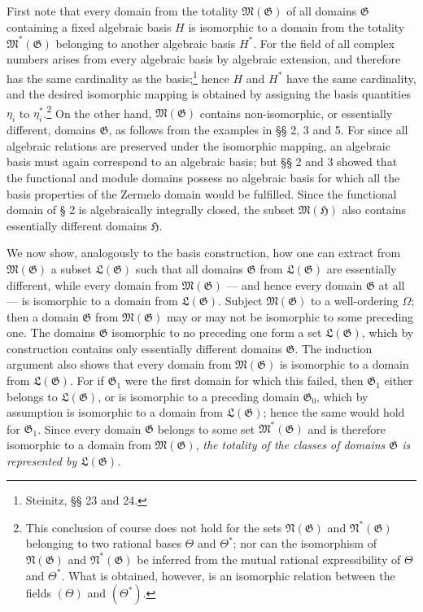 \documentclass[11pt]{article}
\begin{document}
First note that every domain from the totality $\mathfrak M(\mathfrak G)$ of all
domains $\mathfrak G$ containing a fixed algebraic basis $H$ is isomorphic to a
domain from the totality $\mathfrak M^*(\mathfrak G)$ belonging to another
algebraic basis $H^*$. For the field of all complex numbers arises from every
algebraic basis by algebraic extension, and therefore has the same cardinality as
the basis;\footnote{Steinitz, §§ 23 and 24.} hence $H$ and $H^*$ have the same
cardinality, and the desired isomorphic mapping is obtained by assigning the
basis quantities $\eta_i$ to $\eta_i^*$.\footnote{This conclusion of course does
not hold for the sets $\mathfrak N(\mathfrak G)$ and
$\mathfrak N^*(\mathfrak G)$ belonging to two rational bases $\Theta$ and
$\Theta^*$; nor can the isomorphism of $\mathfrak N(\mathfrak G)$ and
$\mathfrak N^*(\mathfrak G)$ be inferred from the mutual rational expressibility
of $\Theta$ and $\Theta^*$. What is obtained, however, is an isomorphic relation
between the fields $(\Theta)$ and $(\Theta^*)$.} On the other hand,
$\mathfrak M(\mathfrak G)$ contains non-isomorphic, or essentially different,
domains $\mathfrak G$, as follows from the examples in §§ 2, 3 and 5. For since
all algebraic relations are preserved under the isomorphic mapping, an algebraic
basis must again correspond to an algebraic basis; but §§ 2 and 3 showed that
the functional and module domains possess no algebraic basis for which all the
basis properties of the Zermelo domain would be fulfilled. Since the functional
domain of § 2 is algebraically integrally closed, the subset
$\mathfrak M(\mathfrak H)$ also contains essentially different domains
$\mathfrak H$.

We now show, analogously to the basis construction, how one can extract from
$\mathfrak M(\mathfrak G)$ a subset $\mathfrak L(\mathfrak G)$ such that all
domains $\mathfrak G$ from $\mathfrak L(\mathfrak G)$ are essentially
different, while every domain from $\mathfrak M(\mathfrak G)$ --- and hence
every domain $\mathfrak G$ at all --- is isomorphic to a domain from
$\mathfrak L(\mathfrak G)$. Subject $\mathfrak M(\mathfrak G)$ to a
well-ordering $\Omega$; then a domain $\mathfrak G$ from
$\mathfrak M(\mathfrak G)$ may or may not be isomorphic to some preceding one.
The domains $\mathfrak G$ isomorphic to no preceding one form a set
$\mathfrak L(\mathfrak G)$, which by construction contains only essentially
different domains $\mathfrak G$. The induction argument also shows that every
domain from $\mathfrak M(\mathfrak G)$ is isomorphic to a domain from
$\mathfrak L(\mathfrak G)$. For if $\mathfrak G_1$ were the first domain for
which this failed, then $\mathfrak G_1$ either belongs to
$\mathfrak L(\mathfrak G)$, or is isomorphic to a preceding domain
$\mathfrak G_0$, which by assumption is isomorphic to a domain from
$\mathfrak L(\mathfrak G)$; hence the same would hold for $\mathfrak G_1$. Since
every domain $\mathfrak G$ belongs to some set $\mathfrak M^*(\mathfrak G)$ and
is therefore isomorphic to a domain from $\mathfrak M(\mathfrak G)$, \emph{the
totality of the classes of domains $\mathfrak G$ is represented by
$\mathfrak L(\mathfrak G)$.}
\end{document}
